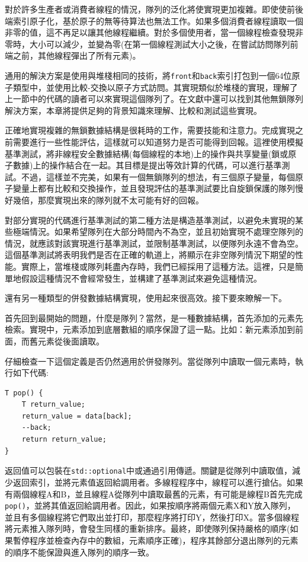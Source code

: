 對於許多生產者或消費者線程的情況，隊列的泛化將使實現更加複雜。即使使前後端索引原子化，基於原子的無等待算法也無法工作。如果多個消費者線程讀取一個非零的值，這不再足以讓其他線程繼續。對於多個使用者，當一個線程檢查發現非零時，大小可以減少，並變為零(在第一個線程測試大小之後，在嘗試訪問隊列前端之前，其他線程彈出了所有元素)。

通用的解決方案是使用與堆棧相同的技術，將\texttt{front}和\texttt{back}索引打包到一個64位原子類型中，並使用比較-交換以原子方式訪問。其實現類似於堆棧的實現，理解了上一節中的代碼的讀者可以來實現這個隊列了。在文獻中還可以找到其他無鎖隊列解決方案，本章將提供足夠的背景知識來理解、比較和測試這些實現。

正確地實現複雜的無鎖數據結構是很耗時的工作，需要技能和注意力。完成實現之前需要進行一些性能評估，這樣就可以知道努力是否可能得到回報。這裡使用模擬基準測試，將非線程安全數據結構(每個線程的本地)上的操作與共享變量(鎖或原子數據)上的操作結合在一起。其目標是提出等效計算的代碼，可以進行基準測試。不過，這樣並不完美，如果有一個無鎖隊列的想法，有三個原子變量，每個原子變量上都有比較和交換操作，並且發現評估的基準測試要比自旋鎖保護的隊列慢好幾倍，那麼實現出來的隊列就不太可能有好的回報。

對部分實現的代碼進行基準測試的第二種方法是構造基準測試，以避免未實現的某些極端情況。如果希望隊列在大部分時間內不為空，並且初始實現不處理空隊列的情況，就應該對該實現進行基準測試，並限制基準測試，以便隊列永遠不會為空。這個基準測試將表明我們是否在正確的軌道上，將顯示在非空隊列情況下期望的性能。實際上，當堆棧或隊列耗盡內存時，我們已經採用了這種方法。這裡，只是簡單地假設這種情況不會經常發生，並構建了基準測試來避免這種情況。

還有另一種類型的併發數據結構實現，使用起來很高效。接下要來瞭解一下。


首先回到最開始的問題，什麼是隊列？當然，是一種數據結構，首先添加的元素先檢索。實現中，元素添加到底層數組的順序保證了這一點。比如：新元素添加到前面，而舊元素從後面讀取。

仔細檢查一下這個定義是否仍然適用於併發隊列。當從隊列中讀取一個元素時，執行如下代碼:

\begin{lstlisting}[style=styleCXX]
T pop() {
	T return_value;
	return_value = data[back];
	--back;
	return return_value;
}
\end{lstlisting}

返回值可以包裝在\texttt{std::optional}中或通過引用傳遞。關鍵是從隊列中讀取值，減少返回索引，並將元素值返回給調用者。多線程程序中，線程可以進行搶佔。如果有兩個線程A和B，並且線程A從隊列中讀取最舊的元素，有可能是線程B首先完成\texttt{pop()}，並將其值返回給調用者。因此，如果按順序將兩個元素X和Y放入隊列，並且有多個線程將它們取出並打印，那麼程序將打印Y，然後打印X。當多個線程將元素推入隊列時，會發生同樣的重新排序。最終，即使隊列保持嚴格的順序(如果暫停程序並檢查內存中的數組，元素順序正確)，程序其餘部分退出隊列的元素的順序不能保證與進入隊列的順序一致。

